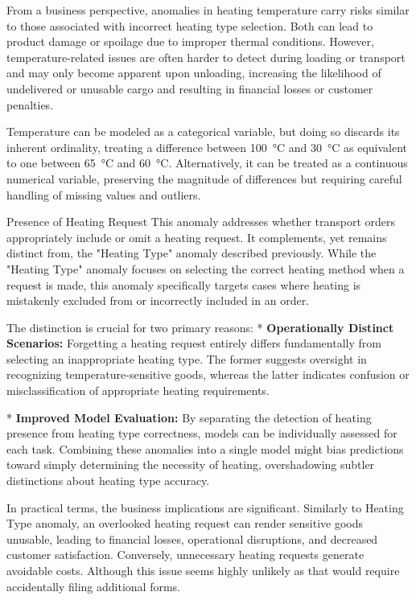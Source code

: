 From a business perspective, anomalies in heating temperature carry risks similar to those associated with incorrect heating type selection. Both can lead to product damage or spoilage due to improper thermal conditions. However, temperature-related issues are often harder to detect during loading or transport and may only become apparent upon unloading, increasing the likelihood of undelivered or unusable cargo and resulting in financial losses or customer penalties.

Temperature can be modeled as a categorical variable, but doing so discards its inherent ordinality, treating a difference between 100~°C and 30~°C as equivalent to one between 65~°C and 60~°C. Alternatively, it can be treated as a continuous numerical variable, preserving the magnitude of differences but requiring careful handling of missing values and outliers.

\secc Presence of Heating Request
This anomaly addresses whether transport orders appropriately include or omit a heating request. It complements, yet remains distinct from, the "Heating Type" anomaly described previously. While the "Heating Type" anomaly focuses on selecting the correct heating method when a request is made, this anomaly specifically targets cases where heating is mistakenly excluded from or incorrectly included in an order.

The distinction is crucial for two primary reasons:
\begitems
* {\bf Operationally Distinct Scenarios:}
Forgetting a heating request entirely differs fundamentally from selecting an inappropriate heating type. The former suggests oversight in recognizing temperature-sensitive goods, whereas the latter indicates confusion or misclassification of appropriate heating requirements.

* {\bf Improved Model Evaluation:}
By separating the detection of heating presence from heating type correctness, models can be individually assessed for each task. Combining these anomalies into a single model might bias predictions toward simply determining the necessity of heating, overshadowing subtler distinctions about heating type accuracy.
\enditems

In practical terms, the business implications are significant. Similarly to Heating Type anomaly, an overlooked heating request can render sensitive goods unusable, leading to financial losses, operational disruptions, and decreased customer satisfaction. Conversely, unnecessary heating requests generate avoidable costs. Although this issue seems highly unlikely as that would require accidentally filing additional forms.


